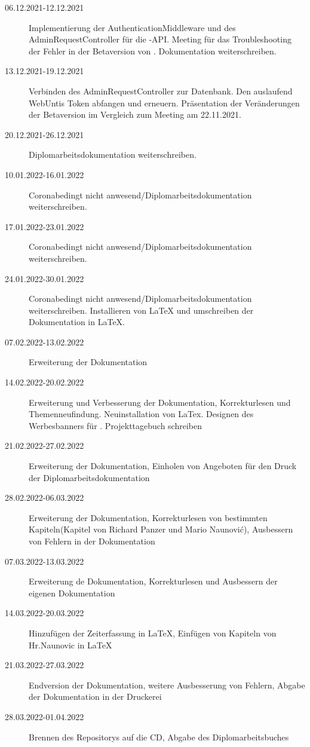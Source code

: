 \begin{description}
    \item[06.12.2021-12.12.2021] Implementierung der AuthenticationMiddleware und des AdminRequestController für die \ZELIA-API. Meeting für das Troubleshooting der Fehler in der Betaversion von \ZELIA. Dokumentation weiterschreiben. 
    \item[13.12.2021-19.12.2021] Verbinden des AdminRequestController zur Datenbank. Den auslaufend WebUntis Token abfangen und erneuern. Präsentation der Veränderungen der Betaversion im Vergleich zum Meeting am 22.11.2021.
    \item[20.12.2021-26.12.2021] Diplomarbeitsdokumentation weiterschreiben.
    \item[10.01.2022-16.01.2022] Coronabedingt nicht anwesend/Diplomarbeitsdokumentation weiterschreiben.
    \item[17.01.2022-23.01.2022] Coronabedingt nicht anwesend/Diplomarbeitsdokumentation weiterschreiben.
    \item[24.01.2022-30.01.2022] Coronabedingt nicht anwesend/Diplomarbeitsdokumentation weiterschreiben. Installieren von LaTeX und umschreiben der Dokumentation in LaTeX.
    \item[07.02.2022-13.02.2022] Erweiterung der Dokumentation
    \item[14.02.2022-20.02.2022] Erweiterung und Verbesserung der Dokumentation, Korrekturlesen und Themenneufindung. Neuinstallation von LaTex. Designen des Werbesbanners für \ZELIA. Projekttagebuch schreiben
    \item[21.02.2022-27.02.2022] Erweiterung der Dokumentation, Einholen von Angeboten für den Druck der Diplomarbeitsdokumentation
    \item[28.02.2022-06.03.2022] Erweiterung der Dokumentation, Korrekturlesen von bestim\-mten Kapiteln(Kapitel von Richard Panzer und Mario Naunović), Ausbessern von Fehlern in der Dokumentation
    \item[07.03.2022-13.03.2022] Erweiterung de Dokumentation, Korrekturlesen und Ausbessern der eigenen Dokumentation
    \item[14.03.2022-20.03.2022] Hinzufügen der Zeiterfassung in LaTeX, Einfügen von Kapiteln von Hr.Naunovic in LaTeX
    \item[21.03.2022-27.03.2022] Endversion der Dokumentation, weitere Ausbesserung von Fehlern, Abgabe der Dokumentation in der Druckerei
    \item[28.03.2022-01.04.2022] Brennen des Repositorys auf die CD, Abgabe des Diplomarbeitsbuches
\end{description}